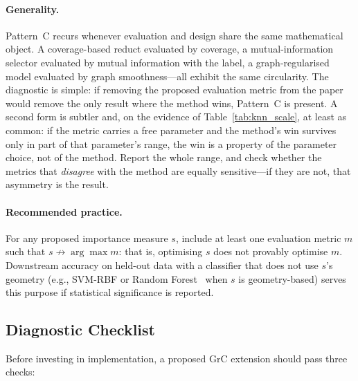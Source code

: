 \paragraph{Generality.}
Pattern~C recurs whenever evaluation and design share the same mathematical
object.  A coverage-based reduct evaluated by coverage, a mutual-information
selector evaluated by mutual information with the label, a graph-regularised
model evaluated by graph smoothness---all exhibit the same circularity.
The diagnostic is simple: if removing the proposed evaluation metric from the
paper would remove the only result where the method wins, Pattern~C is present.
A second form is subtler and, on the evidence of Table~\ref{tab:knn_scale}, at
least as common: if the metric carries a free parameter and the method's win
survives only in part of that parameter's range, the win is a property of the
parameter choice, not of the method.  Report the whole range, and check
whether the metrics that \emph{disagree} with the method are equally
sensitive---if they are not, that asymmetry is the result.

\paragraph{Recommended practice.}
For any proposed importance measure $s$, include at least one evaluation
metric $m$ such that $s \not\to \arg\max m$: that is, optimising $s$ does not
provably optimise $m$.  Downstream accuracy on held-out data with a classifier
that does not use $s$'s geometry (e.g., SVM-RBF or Random
Forest~\cite{Breiman2001RF} when $s$ is geometry-based)
serves this purpose if statistical significance is reported.

\subsection{Diagnostic Checklist}
\label{sec:checklist}

Before investing in implementation, a proposed GrC extension should pass
three checks:

